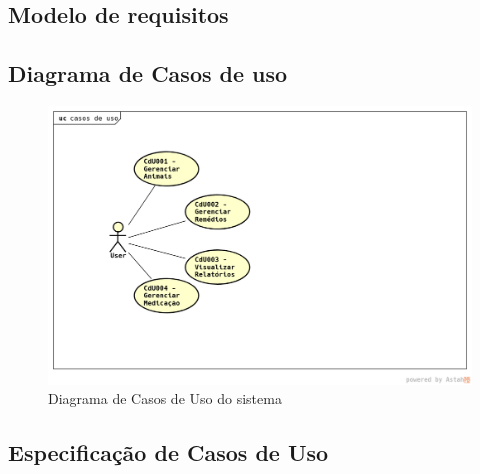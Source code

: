 \documentclass[12pt]{article}
\begin{document}
\begin{titlepage}

\newpage

\section{Modelo de requisitos}

\subsection{Diagrama de Casos de uso}

\begin{figure}[!h]
\begin{center}
\caption{Diagrama de Casos de Uso do sistema}
\includegraphics[width=6in]{img/casosdeuso.png}

\end{center}
\end{figure}


\subsection{Especificação de Casos de Uso}


\end{titlepage}
\end{document}

